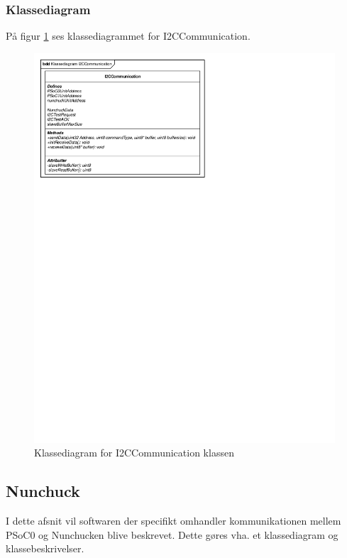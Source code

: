 \subsubsection{Klassediagram}
På figur \ref{figure:klassediagramI2CCommunication} ses klassediagrammet for I2CCommunication. 
\begin{figure}[H]
	\centering
	\includegraphics[]{DesignOgImplementering/images/I2CCommunication}
	\caption{Klassediagram for I2CCommunication klassen}
	\label{figure:klassediagramI2CCommunication}
\end{figure}

\subsection{Nunchuck}
I dette afsnit vil softwaren der specifikt omhandler kommunikationen mellem PSoC0 og Nunchucken blive beskrevet. Dette gøres vha. et klassediagram og klassebeskrivelser.

